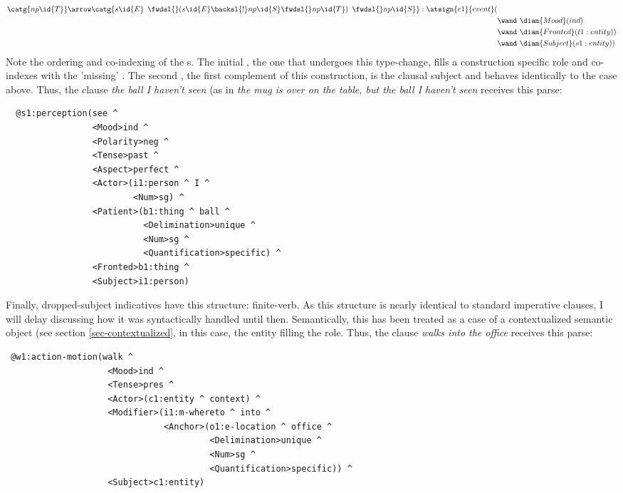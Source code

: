 \begin{align*}
\catg{np\id{T} }  \arrow  \catg{s\id{E} \enspace \fwdsl{} (s\id{E} \backsl{!} np\id{S} \fwdsl{} np\id{T}) \enspace \fwdsl{}np\id{S}}  :  
\atsign{e1}{event}(&   \\ 
      & \wand\ \diam{Mood}(ind) \\
      & \wand\ \diam{Fronted}(t1:entity ) )\\
      & \wand\ \diam{Subject}(s1:entity ) )
\end{align*}
Note the ordering and co-indexing of the s. The initial , the one that undergoes this type-change, fills a construction specific role   and co-indexes with the 'missing' . The second , the first complement of this construction, is the clausal subject and behaves identically to the case above. Thus, the clause \emph{the ball I haven't seen} (as in \emph{the mug is over on the table, but the ball I haven't seen} receives this parse:
\begin{verbatim}
  @s1:perception(see ^ 
                 <Mood>ind ^ 
                 <Polarity>neg ^ 
                 <Tense>past ^ 
                 <Aspect>perfect ^ 
                 <Actor>(i1:person ^ I ^ 
                         <Num>sg) ^ 
                 <Patient>(b1:thing ^ ball ^ 
                           <Delimination>unique ^ 
                           <Num>sg ^ 
                           <Quantification>specific) ^ 
                 <Fronted>b1:thing ^ 
                 <Subject>i1:person)
\end{verbatim}
Finally, dropped-subject indicatives have this structure:  finite-verb. As this structure is nearly identical to standard imperative clauses, I will delay discussing how it was syntactically handled until then. Semantically, this has been treated as a case of a contextualized semantic object (see section \ref{sec-contextualized}, in this case, the entity filling the  role. Thus, the clause \emph {walks into the office} receives this parse:
\begin{verbatim}
 @w1:action-motion(walk ^ 
                    <Mood>ind ^ 
                    <Tense>pres ^ 
                    <Actor>(c1:entity ^ context) ^ 
                    <Modifier>(i1:m-whereto ^ into ^ 
                               <Anchor>(o1:e-location ^ office ^ 
                                        <Delimination>unique ^ 
                                        <Num>sg ^ 
                                        <Quantification>specific)) ^ 
                    <Subject>c1:entity)
\end{verbatim}

